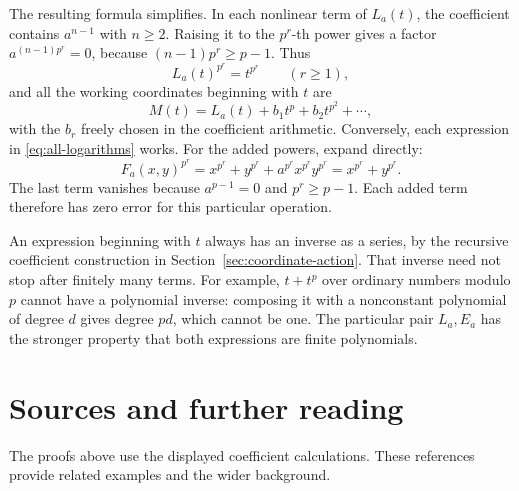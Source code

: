 \documentclass[11pt,letterpaper]{article}
\numberwithin{equation}{section}
\theoremstyle{definition}\newtheorem{example}[theorem]{Example}
\begin{document}
The resulting formula simplifies. In each nonlinear term of \(L_a(t)\), the coefficient contains \(a^{n-1}\) with \(n\ge2\). Raising it to the \(p^r\)-th power gives a factor \(a^{(n-1)p^r}=0\), because \((n-1)p^r\ge p-1\). Thus
\[
 L_a(t)^{p^r}=t^{p^r}\qquad(r\ge1),
\]
and all the working coordinates beginning with \(t\) are
\begin{equation}\label{eq:all-logarithms}
 \boxed{\;M(t)=L_a(t)+b_1t^p+b_2t^{p^2}+\cdots,\;}
\end{equation}
with the \(b_r\) freely chosen in the coefficient arithmetic. Conversely, each expression in \eqref{eq:all-logarithms} works. For the added powers, expand directly:
\[
 F_a(x,y)^{p^r}
 =x^{p^r}+y^{p^r}+a^{p^r}x^{p^r}y^{p^r}
 =x^{p^r}+y^{p^r}.
\]
The last term vanishes because \(a^{p-1}=0\) and \(p^r\ge p-1\). Each added term therefore has zero error for this particular operation.

An expression beginning with \(t\) always has an inverse as a series, by the recursive coefficient construction in Section~\ref{sec:coordinate-action}. That inverse need not stop after finitely many terms. For example, \(t+t^p\) over ordinary numbers modulo \(p\) cannot have a polynomial inverse: composing it with a nonconstant polynomial of degree \(d\) gives degree \(pd\), which cannot be one. The particular pair \(L_a,E_a\) has the stronger property that both expressions are finite polynomials.



\clearpage
\section*{Sources and further reading}

The proofs above use the displayed coefficient calculations. These references provide related examples and the wider background.
\end{document}
